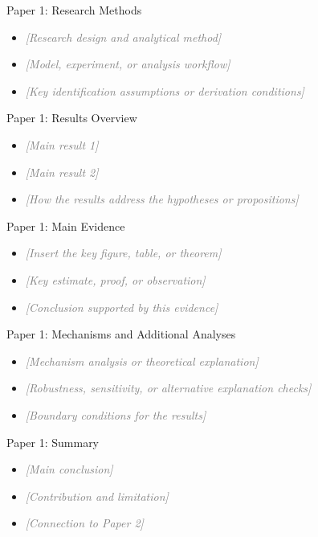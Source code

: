 \documentclass[aspectratio=169]{beamer}
\newcommand{\fillin}[1]{\textcolor{gray}{\textit{[#1]}}}
\begin{document}
\begin{frame}{Paper 1: Research Methods}
  \begin{itemize}
    \item \fillin{Research design and analytical method}
    \item \fillin{Model, experiment, or analysis workflow}
    \item \fillin{Key identification assumptions or derivation conditions}
  \end{itemize}
\end{frame}

\begin{frame}{Paper 1: Results Overview}
  \begin{itemize}
    \item \fillin{Main result 1}
    \item \fillin{Main result 2}
    \item \fillin{How the results address the hypotheses or propositions}
  \end{itemize}
\end{frame}

\begin{frame}{Paper 1: Main Evidence}
  \begin{itemize}
    \item \fillin{Insert the key figure, table, or theorem}
    \item \fillin{Key estimate, proof, or observation}
    \item \fillin{Conclusion supported by this evidence}
  \end{itemize}
\end{frame}

\begin{frame}{Paper 1: Mechanisms and Additional Analyses}
  \begin{itemize}
    \item \fillin{Mechanism analysis or theoretical explanation}
    \item \fillin{Robustness, sensitivity, or alternative explanation checks}
    \item \fillin{Boundary conditions for the results}
  \end{itemize}
\end{frame}

\begin{frame}{Paper 1: Summary}
  \begin{itemize}
    \item \fillin{Main conclusion}
    \item \fillin{Contribution and limitation}
    \item \fillin{Connection to Paper 2}
  \end{itemize}
\end{frame}
\end{document}
